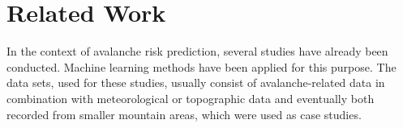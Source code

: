 \documentclass[../masterarbeit.tex]{subfiles}
\begin{document}
	























\section{Related Work}
In the context of avalanche risk prediction, several studies have already been conducted. Machine learning methods have been applied for this purpose. The data sets, used for these studies, usually consist of avalanche-related data in combination with meteorological or topographic data and eventually both recorded from smaller mountain areas, which were used as case studies. 
\end{document}
